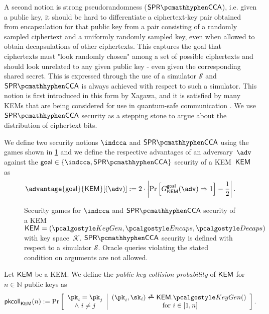 A second notion is strong pseudorandomness ($\sprcca$), i.e. given a public key, it should be hard to differentiate a ciphertext-key pair obtained from encapsulation for that public key from a pair consisting of a randomly sampled ciphertext and a uniformly randomly sampled key, even when allowed to obtain decapsulations of other ciphertexts.
This captures the goal that ciphertexts must "look randomly chosen" among a set of possible ciphertexts and should look unrelated to any given public key - even given the corresponding shared secret.
This is expressed through the use of a simulator $\mathcal S$ and $\sprcca$ is always achieved with respect to such a simulator.
This notion is first introduced \cite{EC:Xagawa22} in this form by Xagawa, and it is satisfied by many KEMs that are being considered for use in quantum-safe communication \cite{EC:Xagawa22}. We use $\sprcca$ security as a stepping stone to argue about the distribution of ciphertext bits.

\begin{definition} \label{def:kem-security}
    We define two security notions $\indcca$ and $\sprcca$ using the games shown in \cref{fig:kem-security} and we define the respective advantages of an adversary~$\adv$ against the $\mathsf{goal} \in \{\indcca, \sprcca\}$ security of a KEM~$\mathsf{KEM}$ as
\[
    \advantage{\mathsf{goal}}{\KEM}[(\adv)] := 2 \cdot \left| \Pr \left[ G^{\mathsf{goal}}_{\KEM}(\adv) \Rightarrow 1 \right] - \frac{1}{2} \right|.
\]
\end{definition}

\begin{figure}
    
    \caption[
        Security games for $\indcca$ and $\sprcca$ security of a KEM or obfuscated KEM.
    ]{
        Security games for $\indcca$ and $\sprcca$ security of a KEM~$\KEM = (\kgen, \encaps, \decaps)$ with key space~$\mathcal K$. $\sprcca$ security is defined with respect to a simulator $\mathcal S$. Oracle queries violating the stated condition on arguments are not allowed.
    }
    \label{fig:kem-security}
\end{figure}

\begin{definition}
    \label{def:pk-collisions}
    Let $\mathsf{KEM}$ be a KEM.
    We define the \emph{public key collision probability} of $\mathsf{KEM}$ for $n \in \mathbb{N}$ public keys as
    \[
        \pkcoll{\KEM}(n) := \Pr\left[
            \begin{array}{c}
                \pk_i = \pk_j \\
                \land~ i \neq j
            \end{array}
            \middle|
            \begin{array}{c}
                (\pk_i,\sk_i) \getsr \KEM.\kgen() \\
                \text{ for } i \in [1,n]
            \end{array}
            \right].
    \]
\end{definition}

